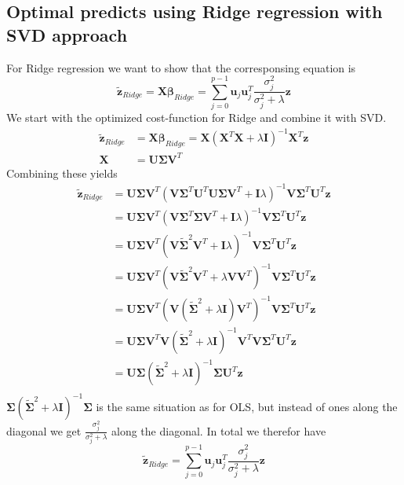 \documentclass{article}
\begin{document}
\subsection{Optimal predicts using Ridge regression with SVD approach}
\label{app_derivations:predicts_ridge_with_svd}
For Ridge regression we want to show that the corresponsing equation is
$$\bm{\tilde{z}}_{Ridge} = \mathbf{X}\bm{\beta}_{Ridge} = \sum_{j=0}^{p-1}\bm{u}_{j}\bm{u}_{j}^{T} \frac{\sigma_{j}^{2}}{\sigma_{j}^2 + \lambda} \bm{z}$$
We start with the optimized cost-function for Ridge and combine it with SVD. 
\begin{align*}
    \bm{\tilde{z}}_{Ridge} &= \mathbf{X}\bm{\beta}_{Ridge} = \mathbf{X}(\mathbf{X}^{T}\mathbf{X} + \lambda\mathbf{I})^{-1}\mathbf{X}^{T}\bm{z} \\
    \mathbf{X} &= \mathbf{U}\bm{\Sigma}\mathbf{V}^{T}
\end{align*}
Combining these yields
\begin{align*}
    \bm{\tilde{z}}_{Ridge} &= \mathbf{U}\bm{\Sigma}\mathbf{V}^{T}(\mathbf{V}\bm{\Sigma}^{T}\mathbf{U}^{T}\mathbf{U}\bm{\Sigma}\mathbf{V}^{T} + \mathbf{I}\lambda)^{-1}\mathbf{V}\mathbf{\Sigma}^{T}\mathbf{U}^{T}\bm{z} \\
    &= \mathbf{U}\bm{\Sigma}\mathbf{V}^{T}(\mathbf{V}\bm{\Sigma}^{T}\bm{\Sigma}\mathbf{V}^{T} + \mathbf{I}\lambda)^{-1}\mathbf{V}\mathbf{\Sigma}^{T}\mathbf{U}^{T}\bm{z} \\ 
    &= \mathbf{U}\bm{\Sigma}\mathbf{V}^{T}(\mathbf{V}\bm{\tilde{\Sigma}}^{2}\mathbf{V}^{T} + \mathbf{I}\lambda)^{-1}\mathbf{V}\mathbf{\Sigma}^{T}\mathbf{U}^{T}\bm{z} \\
    &= \mathbf{U}\bm{\Sigma}\mathbf{V}^{T}(\mathbf{V}\bm{\tilde{\Sigma}}^{2}\mathbf{V}^{T} + \lambda\mathbf{V}\mathbf{V}^{T})^{-1}\mathbf{V}\mathbf{\Sigma}^{T}\mathbf{U}^{T}\bm{z} \\
    &= \mathbf{U}\bm{\Sigma}\mathbf{V}^{T}(\mathbf{V}(\bm{\tilde{\Sigma}}^{2} + \lambda\mathbf{I})\mathbf{V}^{T})^{-1}\mathbf{V}\mathbf{\Sigma}^{T}\mathbf{U}^{T}\bm{z} \\
    &= \mathbf{U}\bm{\Sigma}\mathbf{V}^{T}\mathbf{V}(\bm{\tilde{\Sigma}}^{2} + \lambda\mathbf{I})^{-1}\mathbf{V}^{T}\mathbf{V}\mathbf{\Sigma}^{T}\mathbf{U}^{T}\bm{z} \\
    &= \mathbf{U}\bm{\Sigma}(\bm{\tilde{\Sigma}}^{2} + \lambda\mathbf{I})^{-1}\mathbf{\Sigma}\mathbf{U}^{T}\bm{z} \\
\end{align*} 
$\bm{\Sigma}(\bm{\tilde{\Sigma}}^{2} + \lambda\mathbf{I})^{-1}\bm{\Sigma}$ is the same situation as for OLS, but
instead of ones along the diagonal we get $\frac{\sigma_{j}^{2}}{\sigma_{j}^2 + \lambda}$ along the diagonal. 
In total we therefor have
$$\bm{\tilde{z}}_{Ridge} = \sum_{j=0}^{p-1}\bm{u}_{j}\bm{u}_{j}^{T} \frac{\sigma_{j}^{2}}{\sigma_{j}^2 + \lambda} \bm{z}$$
\end{document}
